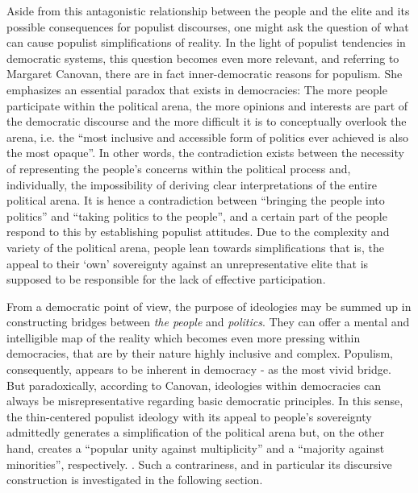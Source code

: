\documentclass[a4paper]{scrreprt}
\begin{document}
Aside from this antagonistic relationship between the people and the elite and its possible consequences for populist discourses, one might ask the question of what can cause populist simplifications of reality. In the light of populist tendencies in democratic systems, this question becomes even more relevant, and referring to Margaret Canovan, there are in fact inner-democratic reasons for populism. She emphasizes an essential paradox that exists in democracies: The more people participate within the political arena, the more opinions and interests are part of the democratic discourse and the more difficult it is to conceptually overlook the arena, i.e. the ``most inclusive and accessible form of politics ever achieved is also the most opaque''. \cite[p.~25]{canovan:2002} In other words, the contradiction exists between the necessity of representing the people's concerns within the political process and, individually, the impossibility of deriving clear interpretations of the entire political arena. It is hence a contradiction between ``bringing the people into politics'' and ``taking politics to the people'', and a certain part of the people respond to this by establishing populist attitudes. \cite[p.~26]{canovan:2002} Due to the complexity and variety of the political arena, people lean towards simplifications that is, the appeal to their `own' sovereignty against an unrepresentative elite that is supposed to be responsible for the lack of effective participation.\par
From a democratic point of view, the purpose of ideologies may be summed up in constructing bridges between {\em the people} and {\em politics}. They can offer a mental and intelligible map of the reality which becomes even more pressing within democracies, that are by their nature highly inclusive and complex. Populism, consequently, appears to be inherent in democracy - as the most vivid bridge. But paradoxically, according to Canovan, ideologies within democracies can always be misrepresentative regarding basic democratic principles. In this sense, the thin-centered populist ideology with its appeal to people’s sovereignty admittedly generates a simplification of the political arena but, on the other hand, creates a ``popular unity against multiplicity'' and a ``majority against minorities'', respectively. \cite[p.~26]{canovan:2002}. Such a contrariness, and in particular its discursive construction is investigated in the following section.
\end{document}
